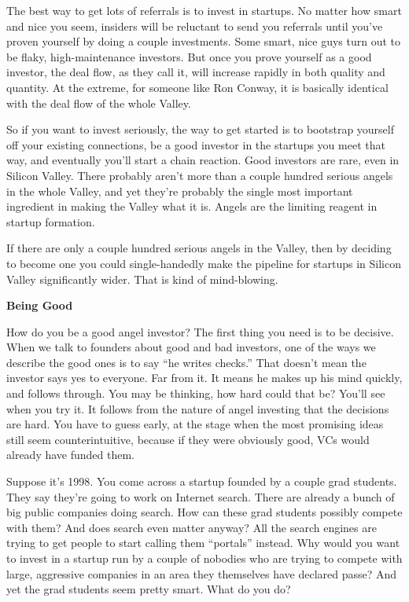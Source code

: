 \documentclass[12pt]{book}
\begin{document}
The best way to get lots of referrals is to invest in startups. No
matter how smart and nice you seem, insiders will be reluctant to send
you referrals until you've proven yourself by doing a couple
investments. Some smart, nice guys turn out to be flaky,
high-maintenance investors. But once you prove yourself as a good
investor, the deal flow, as they call it, will increase rapidly in both
quality and quantity. At the extreme, for someone like Ron Conway, it is
basically identical with the deal flow of the whole Valley.

So if you want to invest seriously, the way to get started is to
bootstrap yourself off your existing connections, be a good investor in
the startups you meet that way, and eventually you'll start a chain
reaction. Good investors are rare, even in Silicon Valley. There
probably aren't more than a couple hundred serious angels in the whole
Valley, and yet they're probably the single most important ingredient in
making the Valley what it is. Angels are the limiting reagent in startup
formation.

If there are only a couple hundred serious angels in the Valley, then by
deciding to become one you could single-handedly make the pipeline for
startups in Silicon Valley significantly wider. That is kind of
mind-blowing.

\textbf{Being Good}

How do you be a good angel investor? The first thing you need is to be
decisive. When we talk to founders about good and bad investors, one of
the ways we describe the good ones is to say ``he writes checks.'' That
doesn't mean the investor says yes to everyone. Far from it. It means he
makes up his mind quickly, and follows through. You may be thinking, how
hard could that be? You'll see when you try it. It follows from the
nature of angel investing that the decisions are hard. You have to guess
early, at the stage when the most promising ideas still seem
counterintuitive, because if they were obviously good, VCs would already
have funded them.

Suppose it's 1998. You come across a startup founded by a couple grad
students. They say they're going to work on Internet search. There are
already a bunch of big public companies doing search. How can these grad
students possibly compete with them? And does search even matter anyway?
All the search engines are trying to get people to start calling them
``portals'' instead. Why would you want to invest in a startup run by a
couple of nobodies who are trying to compete with large, aggressive
companies in an area they themselves have declared passe? And yet the
grad students seem pretty smart. What do you do?
\end{document}
